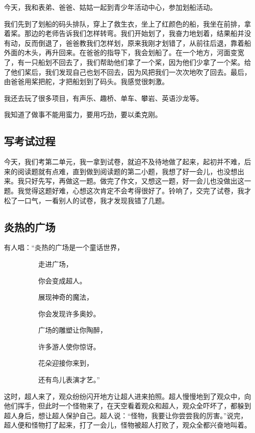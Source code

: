 \documentclass[UTF8,a4paper,titlepage,twoside,10.5pt]{article}
\begin{document}
今天，我和表弟、爸爸、姑姑一起到青少年活动中心，参加划船活动。

我们先到了划船的码头排队，穿上了救生衣，坐上了红颜色的船，我坐在前排，拿着桨。那边的老师告诉我们怎样转弯。我们开始划了，我奋力地划着，结果船并没有动，反而倒退了，爸爸教我们怎样划，原来我刚才划错了，从前往后退，靠着船外面的木头，再升回来。在爸爸的指导下，我会划船了。在一个地方，河面变宽了，有一只船划不回去了，我们帮助他们拿了一个桨，因为他们少拿了一个桨。给了他们桨后，我们发现自己也划不回去，因为风把我们一次次地吹了回去。最后，由爸爸用桨把舵，才把船划到了码头。我感觉很刺激。

我还去玩了很多项目，有声乐、趣桥、单车、攀岩、英语沙龙等。

我知道了做事不能用蛮力，要用巧劲，要以柔克刚。

\subsection{写考试过程}
\label{sec:orgcf95d84}

今天，我们考第二单元，我一拿到试卷，就迫不及待地做了起来，起初并不难，后来的阅读题就有点难，直到做到阅读题的第二小题，我想了好一会儿，也没想出来。我只好先写，再做这一题。做完了作文，又想这一题，好一会儿也没做出这一题。我觉得这题好难，心想这次肯定不会考得很好了。铃响了，交完了试卷，我才松了一口气，一看别人的试卷，我才发现我错了几题。

\subsection{炎热的广场}
\label{sec:org6a04076}

有人唱：“炎热的广场是一个童话世界，

　　　　　走进广场，

　　　　　你会变成超人。

　　　　　展现神奇的魔法，

　　　　　你会发现许多奥妙。

　　　　　广场的雕塑让你陶醉，

　　　　　许多游人使你惊讶。

　　　　　花朵迎接你来到，

　　　　　还有鸟儿表演才艺。”

这时，超人来了，观众纷纷闪开地方让超人进来拍照。超人慢慢地到了观众中，向他们挥手，但此时一个怪物来了，在天空看着观众和超人，观众全吓坏了，都躲到超人身后，想让超人保护自己。超人说：“怪物，我要让你尝尝我的厉害。”说完，超人便和怪物打了起来，打了一会儿，怪物被超人打败了，观众全都兴奋地叫着。
\end{document}
